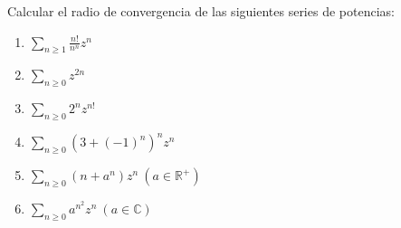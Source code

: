 \begin{ejer}
	Calcular el radio de convergencia de las siguientes series de potencias:
	\begin{enumerate}[label=(\alph*)]
		\item $\sum_{n\geq1} \frac{n!}{n^n}z^n$
		\item $\sum_{n\geq 0} z^{2n}$
		\item $\sum_{n\geq 0} 2^nz^{n!}$
		\item $\sum_{n\geq 0} (3+(-1)^n)^nz^n$
		\item $\sum_{n\geq 0} (n+a^n)z^n \ (a\in\mathbb{R}^+)$
		\item $\sum_{n\geq 0} a^{n^2}z^n \ (a\in\mathbb{C})$
	\end{enumerate}
\end{ejer}

\begin{comment}


\textbf{b)} %

$\sum_{n\geq 0} z^{2n} = \sum_{n\geq 0} \alpha_nz^n$
con $\alpha_nz{2n+1} =0, \alpha_{2n} = 1$

Vemos el límite superior de la sucesión
$\limsup |\alpha_n| = 1 \implies R=\frac{1}{1} = 1$
\end{comment}

